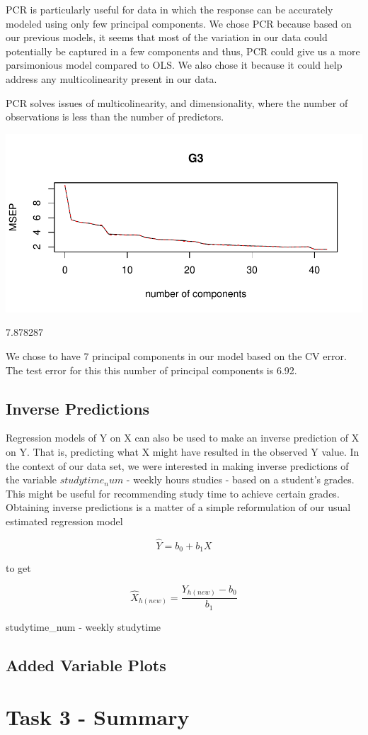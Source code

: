 \documentclass{article}
\begin{document}
PCR is particularly useful for data in which the response can be accurately modeled using only few principal components. We chose PCR because based on our previous models, it seems that most of the variation in our data could potentially be captured in a few components and thus, PCR could give us a more parsimonious model compared to OLS. We also chose it because it could help address any multicolinearity present in our data.

PCR solves issues of multicolinearity, and dimensionality, where the number of observations is less than the number of predictors. 

\includegraphics{Report_4-013}


\begin{Schunk}
\begin{Soutput}
[1] 7.878287
\end{Soutput}
\end{Schunk}


We chose to have 7 principal components in our model based on the CV error. The test error for this this number of principal components is 6.92.

\subsection{Inverse Predictions}

Regression models of Y on X can also be used to make an inverse prediction of X on Y. That is, predicting what X might have resulted in the observed Y value. In the context of our data set, we were interested in making inverse predictions of the variable $studytime_num$ - weekly hours studies - based on a student's grades. This might be useful for recommending study time to achieve certain grades. Obtaining inverse predictions is a matter of a simple reformulation of our usual estimated regression model

$$\hat{Y}=b_{0} + b_{1}X$$

to get 

$$\hat{X}_{h(new)} = \frac{Y_{h(new)}-b_{0}}{b_{1}}$$



studytime_num - weekly studytime

\subsection{Added Variable Plots}



\section{Task 3 - Summary}
\end{document}
